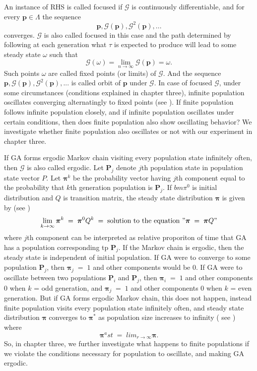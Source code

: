 An instance of RHS is called focused if $\mathcal{G}$ is continuously differentiable, and for every $\bm{p}  \in  \Lambda$
the sequence
\[
\bm{p},  \mathcal{G}(\bm{p}),  {\mathcal{G}}^2(\bm{p}),...
\]
converges. $\mathcal{G}$ is also called focused in this case and the path determined by following at each generation what $\tau$ is expected 
to produce will lead to some steady state $\omega$ such that
\[
\mathcal{G}(\omega) = \lim_{n\to\infty} \mathcal{G}(\bm{p}) = \omega.
\]
Such points $\omega$ are called fixed points (or limits) of $\mathcal{G}$. 
And the sequence $\bm{p},  \mathcal{G}(\bm{p}),  {\mathcal{G}}^2(\bm{p}),...$ is called orbit of $\bm{p}$ under $\mathcal{G}$. 
In case of focused $\mathcal{G}$, under some circumstances (conditions explained in chapter three), 
infinite population oscillates converging alternatingly to fixed points (see \cite{Vose1999}). 
If finite population follows infinite population closely, and if infinite population oscillates under certain conditions, then 
does finite population also show oscillating behavior? We investigate whether finite population also oscillates or not with our experiment 
in chapter three. 

If GA forms ergodic Markov chain visiting every population state infinitely often, then $\mathcal{G}$ is also called ergodic. 
Let $\bm{P}_j$ denote $j$th population state in population state vector $P$. Let $\bm{\pi}^k$ be the probability vector having $j$th component 
equal to the probability that $k$th generation population is $\bm{P}_j$. If $bm{\pi}^0$ is initial distribution and $Q$ is transition matrix, the steady state distribution $\bm{\pi}$ is given by (see \cite{Nix1992})
\[
\lim_{k \to \infty} \bm{\pi}^k \;=\; \bm{\pi}^0 Q^k \;=\; \text{solution to the equation } "\bm{\pi} \; = \; \bm{\pi} Q" 
\]
where $j$th component can be interpreted as relative proporiton of time that GA has a population corresponding tp $\bm{P}_j$. 
If the Markov chain is ergodic, then the steady state is independent of initial population. If GA were to converge to some population $\bm{P}_j$, 
then $\bm{\pi}_j \;=\; 1$ and other components would be $0$. If GA were to oscillate between two populations $\bm{P}_i$ and $\bm{P}_j$, then 
$\bm{\pi}_i \;=\; 1$ and other components $0$ when $k$ = odd generation, and $\bm{\pi}_j \;=\; 1$ and other components $0$ when $k$ = even generation. 
But if GA forms ergodic Markov chain, this does not happen, instead finite population visits every population state infinitely often, and steady state 
distribution $\bm{\pi}$ converges to $\bm{\pi}^\ast$ as population size increases to infinity ( see \cite{Nix1992}) where 
\[
\bm{\pi}^ast \;=\; lim_{r \to \infty} \bm{\pi}.
\]
So, in chapter three, we further investigate what happens to finite populations 
if we violate the conditions necessary for population to oscillate, and making GA ergodic.


